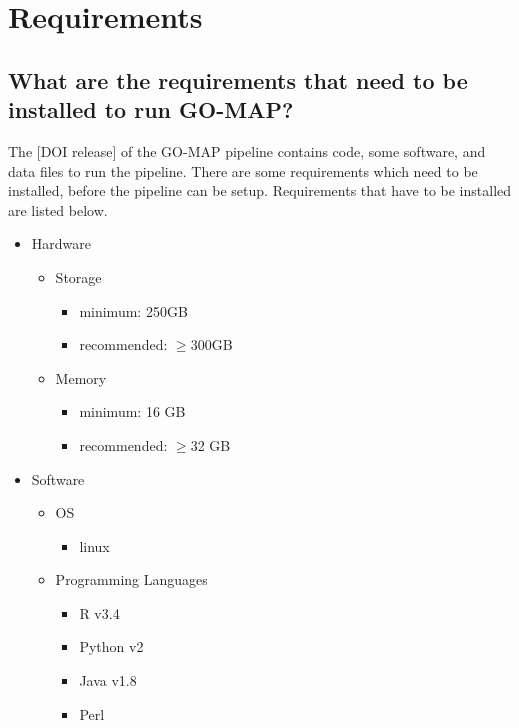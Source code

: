 \section{Requirements}
\label{sec:requirements}

\subsection{What are the requirements that need to be installed to run GO-MAP?}
\label{subsec:install_req}

The [DOI release] of the GO-MAP pipeline contains code, some software, and data files to run the pipeline. There are some requirements which need to be installed, before the pipeline can be setup. Requirements that have to be installed are listed below.

\begin{itemize}
 \item Hardware
 \begin{itemize}
     \item Storage
     \begin{itemize}
         \item minimum: 250GB
         \item recommended: $\geq$300GB
     \end{itemize}
     \item Memory
     \begin{itemize}
         \item minimum: 16 GB
         \item recommended: $\geq$32 GB
     \end{itemize}
 \end{itemize}
 
 \item Software
 \begin{itemize}
     \item OS
     \begin{itemize}
         \item linux
     \end{itemize}
     
     \item Programming Languages
     \begin{itemize}
       \item R v3.4
       \item Python v2
       \item Java v1.8
       \item Perl
     \end{itemize}
    

\end{itemize}
\end{itemize}
